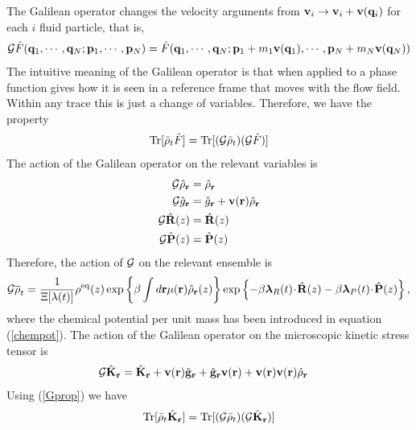 \documentclass[b5paper,openright,10pt]{book}
\newcommand{\esc}{\!\cdot\!}
\begin{document}
The Galilean operator changes the velocity arguments from ${\bf v}_i\to {\bf v}_i+{\bf v}({\bf q}_i)$ for each $i$ fluid particle, that is,
\begin{align}
  {\cal G}\hat{F}({\bf q}_1,\cdots,{\bf q}_N;{\bf p}_1,\cdots,{\bf p}_N)
=\hat{F}({\bf q}_1,\cdots,{\bf q}_N;{\bf p}_1+m_1{\bf v}({\bf q}_1),\cdots,{\bf p}_N+m_N{\bf v}({\bf q}_N))
\end{align}
The intuitive meaning of the Galilean operator is that when applied to a phase function gives how it is seen in a reference frame that moves with the flow field. Within any trace this is just a change of variables. Therefore, we have the property
\begin{align}
  {\rm Tr}[\bar{\rho}_t\hat{F}] &= {\rm Tr}[({\cal G}\bar{\rho}_t)({\cal G}\hat{F})] \nonumber \\
  \label{Gprop}
\end{align}
The action of the Galilean operator on the relevant variables is
\begin{align}
  {\cal G}\hat{\rho}_{\bf r} &= \hat{\rho}_{\bf r} \nonumber\\
  {\cal G}\hat{g}_{\bf r} &= \hat{g}_{\bf r} + {\bf v}({\bf r})\hat{\rho}_{\bf r} \nonumber \\
  {\cal G}\hat{\bf R}(z) &= \hat{\bf R}(z) \nonumber\\
  {\cal G}\hat{\bf P}(z) &= \hat{\bf P}(z)
\end{align}
Therefore, the action of ${\cal G}$ on the relevant ensemble is
\begin{align}
  {\cal G}\overline{\rho}_t =
  \frac{1}{\Xi[\lambda(t)]}\rho^{\rm eq}(z)
\exp\left\{\beta\int d{\bf r}\mu({\bf r})\hat{\rho}_{\bf r}(z)\right\}
\exp\left\{-\beta \boldsymbol{\lambda}_{R}(t)\esc\hat{\bf R}(z)
-\beta \boldsymbol{\lambda}_{P}(t)\esc\hat{\bf P}(z)\right\},
\label{resrelens}
\end{align}
where  the chemical  potential per  unit mass  has been  introduced in
equation  (\ref{chempot}). 
The  action  of the  Galilean  operator on  the
microscopic kinetic stress tensor is
\begin{align}
  {\cal G}\hat{{\bf K}}_{\bf r} &=
\hat{{\bf K}}_{\bf r} 
+{\bf v}({\bf r})\hat{\bf g}_{\bf r}
+\hat{\bf g}_{\bf r}{\bf v}({\bf r})
+{\bf v}({\bf r}){\bf v}({\bf r})\hat{\rho}_{\bf r}
\end{align}
Using (\ref{Gprop}) we have
\begin{align}
  {\rm Tr}[\bar{\rho}_t\hat{{\bf K}}_{\bf r}]={\rm Tr}[({\cal G}\bar{\rho}_t)({\cal G}\hat{{\bf K}}_{\bf r})]
\end{align}
\end{document}
